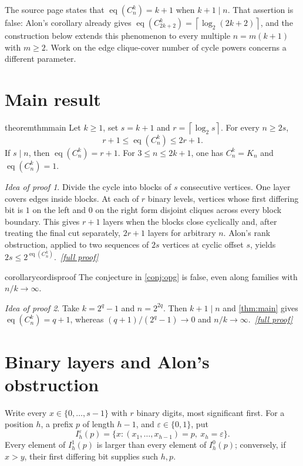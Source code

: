 \documentclass[11pt,a4paper]{article}
\theoremstyle{plain}
\theoremstyle{definition}
\theoremstyle{remark}
\newtheorem*{proofidea}{Idea of proof}
\newcommand{\fullproofref}[1]{\,\hyperref[#1]{\textit{[full proof]}}}
\newcommand{\eqc}{\operatorname{eq}}
\newcommand{\ceil}[1]{\left\lceil #1\right\rceil}
\begin{document}
The source page \cite{West} states that $\eqc(C_n^k)=k+1$ when $k+1\mid n$.  That
assertion is false: Alon's corollary already gives
$\eqc(C_{2k+2}^k)=\ceil{\log_2(2k+2)}$, and the construction below extends this
phenomenon to every multiple $n=m(k+1)$ with $m\ge2$.  Work on the edge clique-cover
number of cycle powers \cite{JH18} concerns a different parameter.

\section{Main result}

\begin{restatable}{theorem}{thmmain}\label{thm:main}
Let $k\ge1$, set $s=k+1$ and $r=\ceil{\log_2s}$.  For every $n\ge2s$,
\[
 r+1\le \eqc(C_n^k)\le2r+1.
\]
If $s\mid n$, then $\eqc(C_n^k)=r+1$.  For $3\le n\le2k+1$, one has
$C_n^k=K_n$ and $\eqc(C_n^k)=1$.
\end{restatable}
\begin{proofidea}
Divide the cycle into blocks of $s$ consecutive vertices.  One layer covers edges
inside blocks.  At each of $r$ binary levels, vertices whose first differing bit is
$1$ on the left and $0$ on the right form disjoint cliques across every block boundary.
This gives $r+1$ layers when the blocks close cyclically and, after treating the final
cut separately, $2r+1$ layers for arbitrary $n$.  Alon's rank obstruction, applied to
two sequences of $2s$ vertices at cyclic offset $s$, yields $2s\le2^{\eqc(C_n^k)}$.
\fullproofref{pf:main}
\end{proofidea}

\begin{restatable}{corollary}{cordisproof}\label{cor:disproof}
The conjecture in \cref{conj:opg} is false, even along families with $n/k\to\infty$.
\end{restatable}
\begin{proofidea}
Take $k=2^q-1$ and $n=2^{2q}$.  Then $k+1\mid n$ and \cref{thm:main} gives
$\eqc(C_n^k)=q+1$, whereas $(q+1)/(2^q-1)\to0$ and $n/k\to\infty$.
\fullproofref{pf:disproof}
\end{proofidea}

\section{Binary layers and Alon's obstruction}

Write every $x\in\{0,\ldots,s-1\}$ with $r$ binary digits, most significant first.
For a position $h$, a prefix $p$ of length $h-1$, and $\varepsilon\in\{0,1\}$, put
\[
 I_h^\varepsilon(p)=\{x:(x_1,\ldots,x_{h-1})=p,\ x_h=\varepsilon\}.
\]
Every element of $I_h^1(p)$ is larger than every element of $I_h^0(p)$; conversely,
if $x>y$, their first differing bit supplies such $h,p$.
\end{document}
